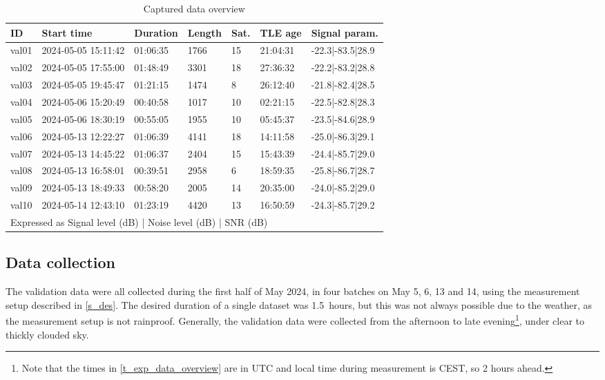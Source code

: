 \begin{table}
    \centering
    \begin{tabular}{lp{0.75in}lllll}
ID    & Start time          & Duration & Length & Sat. & TLE age   & Signal param.\sc{*}       \\\hline
val01 & 2024-05-05 15:11:42 & 01:06:35 & 1766   & 15     & 21:04:31  & -22.3|-83.5|28.9 \\
val02 & 2024-05-05 17:55:00 & 01:48:49 & 3301   & 18     & 27:36:32  & -22.2|-83.2|28.8 \\
val03 & 2024-05-05 19:45:47 & 01:21:15 & 1474   & 8      & 26:12:40  & -21.8|-82.4|28.5 \\
val04 & 2024-05-06 15:20:49 & 00:40:58 & 1017   & 10     & 02:21:15  & -22.5|-82.8|28.3 \\
val05 & 2024-05-06 18:30:19 & 00:55:05 & 1955   & 10     & 05:45:37  & -23.5|-84.6|28.9 \\
val06 & 2024-05-13 12:22:27 & 01:06:39 & 4141   & 18     & 14:11:58  & -25.0|-86.3|29.1 \\
val07 & 2024-05-13 14:45:22 & 01:06:37 & 2404   & 15     & 15:43:39  & -24.4|-85.7|29.0 \\
val08 & 2024-05-13 16:58:01 & 00:39:51 & 2958   & 6      & 18:59:35  & -25.8|-86.7|28.7 \\
val09 & 2024-05-13 18:49:33 & 00:58:20 & 2005   & 14     & 20:35:00  & -24.0|-85.2|29.0 \\
val10 & 2024-05-14 12:43:10 & 01:23:19 & 4420   & 13     & 16:50:59  & -24.3|-85.7|29.2 \\
\multicolumn{7}{l}{\sc{*}Expressed as Signal level (dB) | Noise level (dB) | SNR (dB)}
    \end{tabular}
    \caption{Captured data overview}
    \label{t_exp_data_overview}
\end{table}



\subsection{Data collection}
The validation data were all collected during the first half of May 2024, in four batches on May 5, 6, 13 and 14, using the measurement setup described in \autoref{s_des}. The desired duration of a single dataset was \qty{1.5}{hours}, but this was not always possible due to the weather, as the measurement setup is not rainproof. Generally, the validation data were collected from the afternoon to late evening\footnote{Note that the times in \autoref{t_exp_data_overview} are in UTC and local time during measurement is CEST, so 2 hours ahead.}, under clear to thickly clouded sky.

